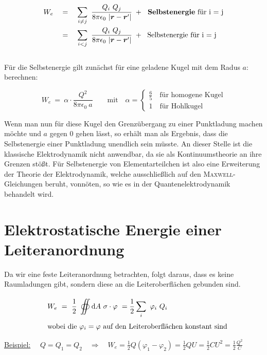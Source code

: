 \begin{align*}
W_e \quad &= \quad \sum_{i\neq j} \ \frac{Q_i \ Q_j}{8\pi\epsilon_0 \ |\vec{r}-\vec{r}'|} \; + \; \text{\textbf{ Selbstenergie} für i = j}\\
&= \quad \sum_{i<j} \ \frac{Q_i \ Q_j}{8\pi\epsilon_0 \ |\vec{r}-\vec{r}'|} \; + \; \text{ Selbstenergie für i = j}\\
\end{align*}
\ \\
Für die Selbstenergie gilt zunächst für eine geladene Kugel mit dem Radus $a$: berechnen:

\begin{equation*}
W_e \ = \ \alpha \cdot \frac{Q^2}{8\pi\epsilon_0 \ a} \qquad \text{mit} \quad \alpha = \begin{cases}
\frac{6}{5} \quad \text{für homogene Kugel}\\
1 \quad \text{für Hohlkugel}
\end{cases}	
\end{equation*}	

Wenn man nun für diese Kugel den Grenzübergang zu einer Punktladung machen möchte und $a$ gegen 0 gehen lässt, so erhält man als Ergebnis, dass die Selbstenergie einer Punktladung unendlich sein müsste. An dieser Stelle ist die klassische Elektrodynamik nicht anwendbar, da sie als Kontinuumstheorie an ihre Grenzen stößt. Für Selbstenergie von Elementarteilchen ist also eine Erweiterung der Theorie der Elektrodynamik, welche ausschließlich auf den \textsc{Maxwell}-Gleichungen beruht, vonnöten, so wie es in der Quantenelektrodynamik behandelt wird.

\section{Elektrostatische Energie einer Leiteranordnung}

Da wir eine feste Leiteranordnung betrachten, folgt daraus, dass es keine Raumladungen gibt, sondern diese an die Leiteroberflächen gebunden sind.

\begin{align*}
& \quad W_e \ = \ \frac{1}{2} \ \oiint\limits_{{}}^{{}}\mathrm{d}{A}\  \sigma\cdot\varphi \  =  \frac{1}{2} \sum_i \ \varphi_i \ Q_i\\
&\quad \text{wobei die }\varphi_i = \varphi \text{ auf den Leiteroberflächen konstant sind}
\end{align*}

\underline{Beispiel:} $\quad Q=Q_1=Q_2 \quad\Rightarrow\quad  W_e =\frac{1}{2}Q(\varphi_1-\varphi_2 ) = \frac{1}{2}QU = \frac{1}{2}CU^2 = \frac{1}{2}\frac{Q^2}{C}$\

